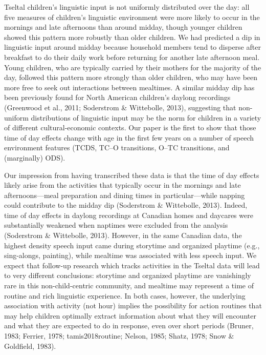 \documentclass[floatsintext,man]{apa6}
\theoremstyle{definition}
\theoremstyle{definition}
\theoremstyle{definition}
\theoremstyle{remark}
\begin{document}
Tseltal children's linguistic input is not uniformly distributed over
the day: all five measures of children's linguistic environment were
more likely to occur in the mornings and late afternoons than around
midday, though younger children showed this pattern more robustly than
older children. We had predicted a dip in linguistic input around midday
because household members tend to disperse after breakfast to do their
daily work before returning for another late afternoon meal. Young
children, who are typically carried by their mothers for the majority of
the day, followed this pattern more strongly than older children, who
may have been more free to seek out interactions between mealtimes. A
similar midday dip has been previously found for North American
children's daylong recordings (Greenwood et al., 2011; Soderstrom \&
Wittebolle, 2013), suggesting that non-uniform distributions of
linguistic input may be the norm for children in a variety of different
cultural-economic contexts. Our paper is the first to show that those
time of day effects change with age in the first few years on a number
of speech environment features (TCDS, TC--O transitions, O--TC
transitions, and (marginally) ODS).

Our impression from having transcribed these data is that the time of
day effects likely arise from the activities that typically occur in the
mornings and late afternoons---meal preparation and dining times in
particular---while napping could contribute to the midday dip
(Soderstrom \& Wittebolle, 2013). Indeed, time of day effects in daylong
recordings at Canadian homes and daycares were substantially weakened
when naptimes were excluded from the analysis (Soderstrom \& Wittebolle,
2013). However, in the same Canadian data, the highest density speech
input came during storytime and organized playtime (e.g., sing-alongs,
painting), while mealtime was associated with less speech input. We
expect that follow-up research which tracks activities in the Tseltal
data will lead to very different conclusions: storytime and organized
playtime are vanishingly rare in this non-child-centric community, and
mealtime may represent a time of routine and rich linguistic experience.
In both cases, however, the underlying association with activity (not
hour) implies the possibility for action routines that may help children
optimally extract information about what they will encounter and what
they are expected to do in response, even over short periods (Bruner,
1983; Ferrier, 1978; tamis2018routine; Nelson, 1985; Shatz, 1978; Snow
\& Goldfield, 1983).
\end{document}
